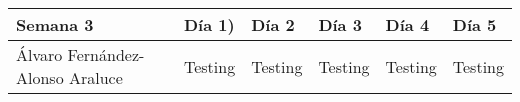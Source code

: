 \begin{table}[h]
	\centering
	\begin{tabular}{| p{2cm} | p{2cm} | p{2cm} | p{2cm} | p{2cm} | p{2cm} |}
		\rowcolor[HTML]{329A9D} 
		{\color[HTML]{FFFFFF} \textbf{Semana 3}} & {\color[HTML]{FFFFFF} \textbf{Día 1)}} & {\color[HTML]{FFFFFF} \textbf{Día 2}} & {\color[HTML]{FFFFFF} \textbf{Día 3}} & {\color[HTML]{FFFFFF} \textbf{Día 4}}  & {\color[HTML]{FFFFFF} \textbf{Día 5}} \\ \hline
		Álvaro Fernández-Alonso Araluce & Testing & Testing & Testing & Testing & Testing \\ \hline
	\end{tabular}
\end{table}

